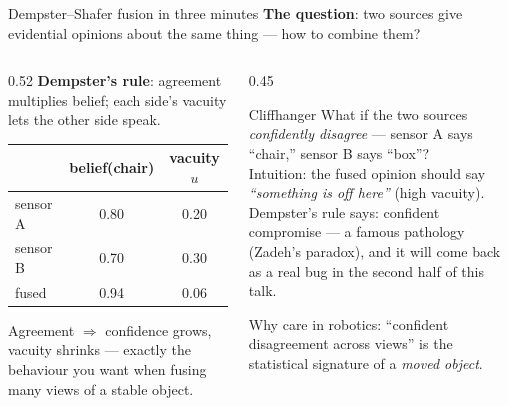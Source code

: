 \documentclass[aspectratio=169,10pt]{beamer}
\newcommand{\srcnote}[1]{{\tiny\color{ink!55}#1}}
\newcommand{\good}[1]{{\color{uLow}#1}}
\newcommand{\bad}[1]{{\color{uHigh}#1}}
\begin{document}
\begin{frame}{Dempster--Shafer fusion in three minutes}
  \textbf{The question}: two sources give evidential opinions about the same
  thing --- how to combine them?
  \vspace{1mm}
  \begin{columns}[T]
    \begin{column}{0.52\textwidth}
      \textbf{Dempster's rule}: agreement multiplies belief; each side's
      vacuity lets the other side speak.
      \vspace{1mm}
      \begin{center}
      \small
      \begin{tabular}{lcc}
        \toprule
        & belief(chair) & vacuity $u$\\
        \midrule
        sensor A & 0.80 & 0.20\\
        sensor B & 0.70 & 0.30\\
        \midrule
        fused    & \good{0.94} & \good{0.06}\\
        \bottomrule
      \end{tabular}
      \end{center}
      \vspace{1mm}
      Agreement $\Rightarrow$ confidence grows, vacuity shrinks ---
      exactly the behaviour you want when fusing many views of a stable
      object.
    \end{column}
    \begin{column}{0.45\textwidth}
      \begin{block}{Cliffhanger}
        What if the two sources \emph{confidently disagree} --- sensor A
        says ``chair,'' sensor B says ``box''?\\[1mm]
        Intuition: the fused opinion should say \emph{``something is off
        here''} (high vacuity).\\[1mm]
        Dempster's rule says: \bad{confident compromise} --- a famous
        pathology (Zadeh's paradox), and it will come back as a
        \alert{real bug} in the second half of this talk.
      \end{block}
      \vspace{1mm}
      \srcnote{Why care in robotics: ``confident disagreement across
      views'' is the statistical signature of a \emph{moved object}.}
    \end{column}
  \end{columns}
\end{frame}
\end{document}

